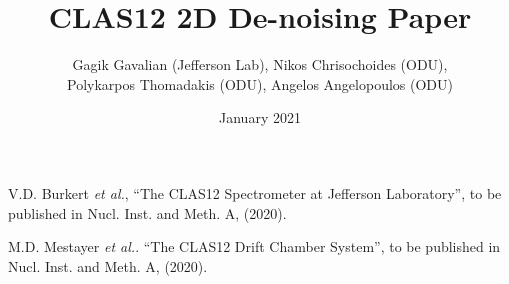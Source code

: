 \documentclass{article}
\title{CLAS12 2D De-noising Paper}
\author{Gagik Gavalian (Jefferson Lab), Nikos Chrisochoides (ODU), \\
Polykarpos Thomadakis (ODU), Angelos Angelopoulos (ODU)}
\date{January 2021}
\begin{document}
\maketitle






\newpage

%
%

\begin{thebibliography}{99}

V.D. Burkert {\it et al.}, ``The CLAS12 Spectrometer at Jefferson Laboratory'', to be published in Nucl. Inst. and Meth. A, (2020). 

M.D. Mestayer {\it et al.}. ``The CLAS12 Drift Chamber System'', to be published in Nucl. Inst. and Meth. A, (2020). 

\end{thebibliography}
\end{document}
